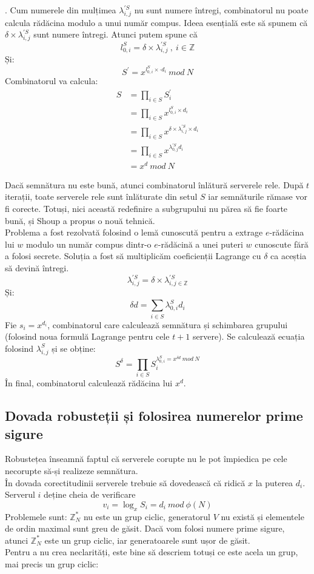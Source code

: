 \documentclass[12pt, oneside]{book}
\begin{document}
.
Cum numerele din mulțimea $ \lambda_{i,j}^{'S}$ nu sunt numere întregi, combinatorul nu poate calcula rădăcina modulo a unui număr compus. Ideea esențială este să spunem că $\delta \times \lambda_{i,j}^{'S}$ sunt numere întregi. Atunci putem spune că 
$$l_{0,i}^{S} = \delta \times \lambda_{i,j}^{'S} \ , \ i \in \mathbb{Z} $$
Și:
$$ S^{'} = x^{l_{0,i}^{S} \times \cdot   d_i } \ mod \ N   $$
Combinatorul va calcula:
\begin{align*}
S &= \prod_{i \in S}^{} S_{i}^{'}\\ 
&= \prod_{i \in S}^{} x^{l_{0,i}^{S} \times d_i    } \\
 &= \prod_{i \in S}^{}  x^{\delta \times \lambda_{i,j}^{'S} \times d_i} \\ 
 &= \prod_{i \in S}^{} 
x^{\lambda_{0,j}^{'S} d_i}\\ &= x^d \ mod \ N  
\end{align*}


Dacă semnătura nu este bună, atunci combinatorul înlătură serverele rele. După $t$ iterații, toate serverele rele sunt înlăturate din setul $S$ iar semnăturile rămase vor fi corecte. Totuși, nici această redefinire a subgrupului nu părea să fie foarte bună, și Shoup a propus o nouă tehnică. \\
Problema a fost rezolvată folosind o lemă cunoscută pentru a extrage $e$-rădăcina lui $w$ modulo un număr compus dintr-o $e$-rădăcină a unei puteri $w$ cunoscute fără a folosi secrete. Soluția a fost să multiplicăm coeficienții Lagrange cu $\delta$ ca aceștia să devină întregi. 
$$ \lambda_{i,j}^{'S} = \delta \times \lambda_{i,j \in \mathbb{Z}}^{'S} $$
Și:
$$ \delta d = \sum_{i \in S}^{} \lambda_{0,i}^{S} d_i $$
Fie $ s_i = x^{d_i} $, combinatorul care calculează semnătura și schimbarea grupului (folosind noua formulă Lagrange pentru cele $t+1$ servere). Se calculează ecuația folosind $\lambda_{i,j}^{S} $ și se obține:
$$S^{\delta} = \prod_{i \in S}^{} S_{i}^{\lambda_{0,i}^{S} = x^{\delta d} \ mod \ N}$$
În final, combinatorul calculează rădăcina lui $x^d$.

\subsection{Dovada robusteții și folosirea numerelor prime sigure}
Robustețea înseamnă faptul că serverele corupte nu le pot împiedica pe cele necorupte să-și realizeze semnătura. \\
În dovada corectitudinii serverele trebuie să dovedească că ridică $x$ la puterea $d_i$. Serverul $i$ deține cheia de verificare
$$ v_i = \log_{x} S_i = d_i \ mod \ \phi(N)$$
Problemele sunt: $\mathbb{Z}_{N}^{*}$ nu este un grup ciclic,  generatorul $V$ nu există și elementele de ordin maximal sunt greu de găsit. Dacă vom folosi numere prime sigure, atunci $\mathbb{Z}_{N}^{*}$ este un grup ciclic, iar generatoarele sunt ușor de găsit. \\
Pentru a nu crea neclarități, este bine să descriem totuși ce este acela un grup, mai precis un grup ciclic: 
\end{document}
